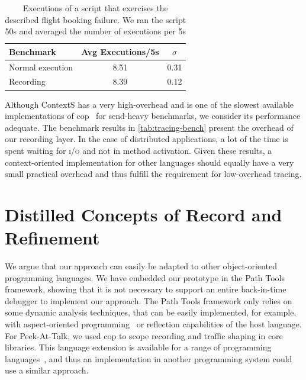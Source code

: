 \documentclass[preprint,3p]{elsarticle}
\newcommand{\ac}[1]{\gls{#1}}
\newcommand{\io}{\textsc{i/o}\xspace}
\newcommand{\toolname}{Peek-At-Talk\xspace}
\begin{document}
\begin{table}
  \centering
  \begin{tabular}{l | c c}
    Benchmark & Avg Executions/5s & $\sigma$ \\
    \hline
    Normal execution & 8.51 & 0.31 \\
    Recording & 8.39 & 0.12 \\
  \end{tabular}
  \caption{Executions of a script that exercises the described flight
    booking failure. We ran the script 50s and averaged the number of
    executions per 5s}
  \label{tab:tracing-bench}
\end{table}

Although ContextS has a very high-overhead and is one of the slowest
available implementations of \ac{cop}~\cite{Appeltauer2009} for
send-heavy benchmarks, we consider its performance adequate. The
benchmark results in \autoref{tab:tracing-bench} present the overhead
of our recording layer. In the case of distributed applications, a lot
of the time is spent waiting for \io and not in method
activation. Given these results, a context-oriented implementation for
other languages should equally have a very small practical overhead
and thus fulfill the requirement for low-overhead tracing.

\section{Distilled Concepts of Record and Refinement}
\label{sec:dist-conc-record}

We argue that our approach can easily be adapted to other object-oriented
programming languages. We have embedded our prototype in the Path Tools
framework, showing that it is not necessary to support an entire back-in-time
debugger to implement our approach. The Path Tools framework only relies on some
dynamic analysis techniques, that can be easily implemented, for example, with
aspect-oriented programming~\cite{gschwind2003idd} or reflection capabilities of
the host language. For \toolname, we used \ac{cop} to scope recording and
traffic shaping in core libraries. This language extension is available for a
range of programming languages~\cite{Appeltauer2009}, and thus an implementation
in another programming system could use a similar approach.
\end{document}
